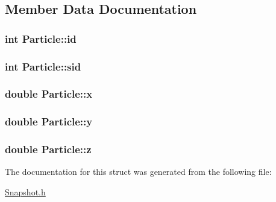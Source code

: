 \subsection{Member Data Documentation}
\hypertarget{structParticle_a544b202775517f8ba05efcb9e0a21bee}{}
\subsubsection[{id}]{\setlength{\rightskip}{0pt plus 5cm}int Particle\+::id}\label{structParticle_a544b202775517f8ba05efcb9e0a21bee}
\hypertarget{structParticle_a4eb60d0df70f20b30af6ff967579fa65}{}
\subsubsection[{sid}]{\setlength{\rightskip}{0pt plus 5cm}int Particle\+::sid}\label{structParticle_a4eb60d0df70f20b30af6ff967579fa65}
\hypertarget{structParticle_a1e3e5e103cee69ae9acb9c3269d009d7}{}
\subsubsection[{x}]{\setlength{\rightskip}{0pt plus 5cm}double Particle\+::x}\label{structParticle_a1e3e5e103cee69ae9acb9c3269d009d7}
\hypertarget{structParticle_a434ab690dde4422ac74ae10f6ace7a52}{}
\subsubsection[{y}]{\setlength{\rightskip}{0pt plus 5cm}double Particle\+::y}\label{structParticle_a434ab690dde4422ac74ae10f6ace7a52}
\hypertarget{structParticle_a518399a50ebdd632b22d7f48e5958461}{}
\subsubsection[{z}]{\setlength{\rightskip}{0pt plus 5cm}double Particle\+::z}\label{structParticle_a518399a50ebdd632b22d7f48e5958461}


The documentation for this struct was generated from the following file\+:\begin{DoxyCompactItemize}
\item 
\hyperlink{Snapshot_8h}{Snapshot.\+h}\end{DoxyCompactItemize}
